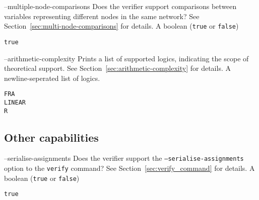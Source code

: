 \clOutputOption
{--multiple-node-comparisons}
{Does the verifier support comparisons between variables representing different nodes in the same network? See Section~\ref{sec:multi-node-comparisons} for details.}
{A boolean (\texttt{true} or \texttt{false})}
\begin{lstlisting}[style=bash]
%*\exampleVerifier* supports --multiple-node-comparisons
true
\end{lstlisting}

\clOutputOption
{--arithmetic-complexity}
{Prints a list of supported \vnnlib{} logics, indicating the scope of theoretical support. See Section~\ref{sec:arithmetic-complexity} for details.
}
{A newline-seperated list of logics.}
\begin{lstlisting}[style=bash]
%*\exampleVerifier* supports --logics
FRA
LINEAR
R
\end{lstlisting}

\subsection{Other capabilities}
\label{sec:other-capabilities}

\clOutputOption
{--serialise-assignments}
{Does the verifier support the \texttt{--serialise-assignments} option to the \texttt{verify} command? See Section~\ref{sec:verify_command} for details.}
{A boolean (\texttt{true} or \texttt{false})}
\begin{lstlisting}[style=bash]
%*\exampleVerifier* supports --serialise-assignments
true
\end{lstlisting}




